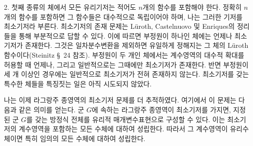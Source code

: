 2. 첫째 종류의 체에서 모든 유리기저는 적어도 $n$개의 함수를 포함해야 한다. 정확히 $n$개의 함수를 포함하면 그 함수들은 대수적으로 독립이어야 하며, 나는 그러한 기저를 \glqq{}최소기저\grqq{}라 부른다. 최소기저의 존재 문제는 Lüroth, Castelnuovo 및 Enriques의 정리들을 통해 부분적으로 답할 수 있다. 이에 따르면 부정원이 하나인 체에는 언제나 최소기저가 존재한다. 그것은 일차분수변환을 제외하면 유일하게 정해지는 그 체의 Lüroth 함수이다(Steinitz \S\ 24 참조). 부정원이 두 개인 체에서는 계수영역의 대수적 확대를 허용할 때 언제나, 그리고 일반적으로는 그때에만 최소기저가 존재한다. 반면 부정원이 세 개 이상인 경우에는 일반적으로 최소기저가 전혀 존재하지 않는다. 최소기저를 갖는 특수한 체들을 특징짓는 일은 아직 시도되지 않았다.

나는 이제 라그랑주 종영역의 최소기저 문제를 더 추적하였다. 여기에서 이 문제는 다음과 같은 의미를 얻는다. \glqq{}군 $G$에 속하는 라그랑주 종영역이 최소기저를 가지면, 지정된 군 $G$를 갖는 방정식 전체를 유리적 매개변수표현으로 구성할 수 있다. 이는 최소기저의 계수영역을 포함하는 모든 수체에 대하여 성립한다. 따라서 그 계수영역이 유리수체이면 특히 임의의 모든 수체에 대하여 성립한다.\grqq{}
